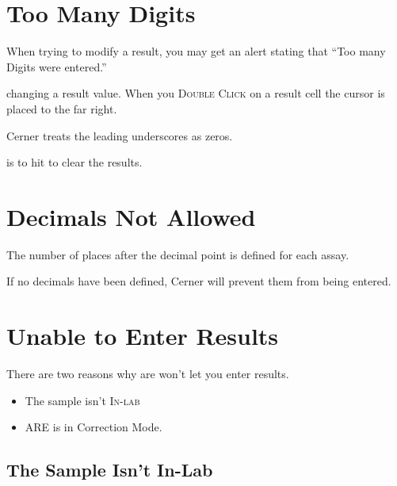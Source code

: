 \section{Too Many Digits}

When trying to modify a result, you may get an alert stating that ``Too many Digits were entered.''\\


 changing a result value. When you \textsc{Double Click} on a result cell the cursor is placed to the far right.\\


Cerner treats the leading underscores as zeros.

 is to hit {\faKeyboardO}  to clear the results.\\


\section{Decimals Not Allowed}

The number of places after the decimal point is defined for each assay.

If no decimals have been defined, Cerner will prevent them from being entered.\\


\section{Unable to Enter Results}

There are two reasons why \gls{are} won't let you enter results.

\begin{itemize}
    \item{The sample isn't \textsc{In-lab}}
    \item{ARE is in Correction Mode.}
\end{itemize}

\subsection{The Sample Isn't In-Lab}


